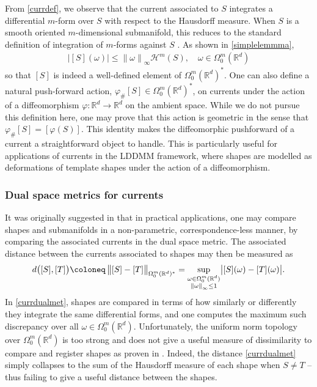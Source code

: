 \documentclass[sn-mathphys-num]{sn-jnl}%
\theoremstyle{thmstyleone}%
\theoremstyle{thmstyletwo}%
\theoremstyle{thmstylethree}%
\numberwithin{remark}{section}
\numberwithin{definition}{section}
\numberwithin{equation}{section}
\numberwithin{theorem}{section}
\newcommand{\norm}[1]{\left\lVert#1\right\rVert}
\newcommand{\R}{\ensuremath{\mathbb{R}}}%
\begin{document}
From \cref{currdef}, we observe that the current associated to $S$  integrates a differential $m$-form over  $S$ with respect to the Hausdorff measure. When $S$ is a smooth oriented $m$-dimensional submanifold, this reduces to the standard definition of integration of $m$-forms against $S$ \cite{NCThesis}. As shown in \cref{simplelemmma},
\begin{align*}
    \lvert [S](\omega)\rvert \leq \norm{\omega}_{\infty}\mathcal{H}^{m}(S),\quad \omega \in  \Omega_{0}^{m}(\R^{d})
\end{align*}
so that $[S]$ is indeed a well-defined element of $ \Omega_{0}^{m}(\R^{d})^{*}$. One can also define a natural push-forward action, $\varphi_{\#}[S] \in \Omega_{0}^{m}(\R^{d})^{*}$, on currents under the action of a diffeomorphism $\varphi \colon \R^{d} \to \R^{d}$ on the ambient space. While we do not pursue this definition here, one may prove \cite{NCThesis} that this action is geometric in the sense that
$   \varphi_{\#}[S] = [\varphi(S)]$.
This identity makes the diffeomorphic pushforward of a current a straightforward object to handle. This is particularly useful for applications of currents in the LDDMM framework, where shapes are modelled as deformations of template shapes under the action of a diffeomorphism.


\subsubsection{Dual space metrics for currents}
It was originally suggested in \cite{GlaunesCurrents} that in practical applications, one may compare shapes and submanifolds in a non-parametric, correspondence-less manner, by comparing the associated currents in the dual space metric. The associated distance between the currents associated to shapes may then be measured as
\begin{align}\label{currdualmet}
   d\bigl([S],[T]\bigr) \coloneq \norm{\vphantom{\big|}[S]-[T]}_{\Omega_{0}^{m}(\R^{d})^{*} } = \underset{\substack{\omega \in \Omega_{0}^{m}(\R^{d})\\\norm{\omega}_\infty \le 1}}{\sup}{\big\lvert [S](\omega) - [T](\omega)\big\rvert }.
\end{align}
In \cref{currdualmet}, shapes are compared in terms of how similarly or differently they integrate the same differential forms, and one computes the maximum such discrepancy over all $\omega \in \Omega_{0}^{m}(\R^{d})$. Unfortunately, the uniform norm topology over $\Omega_{0}^{m}(\R^{d})$ is too strong and does not give a useful measure of dissimilarity to compare and register shapes as proven in \cite{Charon}. Indeed, the distance \cref{currdualmet} simply collapses to the sum of the Hausdorff measure of each shape when $S\neq T$ -- thus  failing to give a useful distance between the shapes.  
\end{document}

